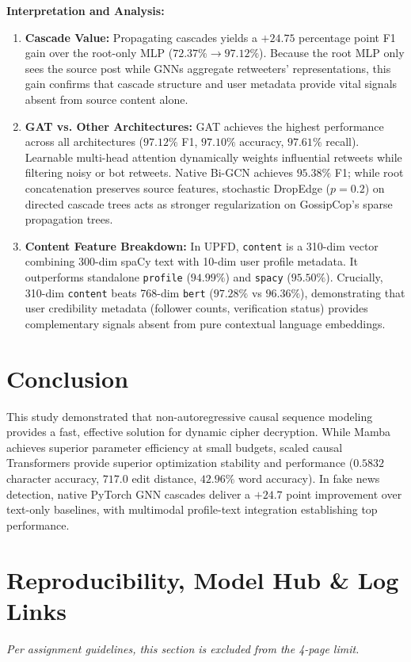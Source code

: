 \documentclass[12pt,a4paper]{article}
\begin{document}
\noindent\textbf{Interpretation and Analysis:}
\begin{enumerate}[leftmargin=*]
    \item \textbf{Cascade Value:} Propagating cascades yields a $+24.75$ percentage point F1 gain over the root-only MLP ($72.37\% \to 97.12\%$). Because the root MLP only sees the source post while GNNs aggregate retweeters' representations, this gain confirms that cascade structure and user metadata provide vital signals absent from source content alone.
    \item \textbf{GAT vs. Other Architectures:} GAT achieves the highest performance across all architectures ($97.12\%$ F1, $97.10\%$ accuracy, $97.61\%$ recall). Learnable multi-head attention dynamically weights influential retweets while filtering noisy or bot retweets. Native Bi-GCN achieves $95.38\%$ F1; while root concatenation preserves source features, stochastic DropEdge ($p=0.2$) on directed cascade trees acts as stronger regularization on GossipCop's sparse propagation trees.
    \item \textbf{Content Feature Breakdown:} In UPFD, \texttt{content} is a 310-dim vector combining 300-dim spaCy text with 10-dim user profile metadata. It outperforms standalone \texttt{profile} ($94.99\%$) and \texttt{spacy} ($95.50\%$). Crucially, 310-dim \texttt{content} beats 768-dim \texttt{bert} ($97.28\%$ vs $96.36\%$), demonstrating that user credibility metadata (follower counts, verification status) provides complementary signals absent from pure contextual language embeddings.
\end{enumerate}

\section{Conclusion}
This study demonstrated that non-autoregressive causal sequence modeling provides a fast, effective solution for dynamic cipher decryption. While Mamba achieves superior parameter efficiency at small budgets, scaled causal Transformers provide superior optimization stability and performance ($0.5832$ character accuracy, $717.0$ edit distance, $42.96\%$ word accuracy). In fake news detection, native PyTorch GNN cascades deliver a $+24.7$ point improvement over text-only baselines, with multimodal profile-text integration establishing top performance.

\newpage
\appendix
\section*{Reproducibility, Model Hub \& Log Links}
\noindent\textit{Per assignment guidelines, this section is excluded from the 4-page limit.}
\end{document}
